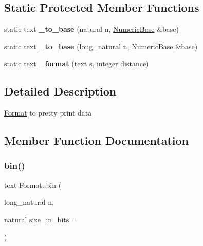 \subsection*{Static Protected Member Functions}
\begin{DoxyCompactItemize}
\item 
\mbox{\label{classez_1_1essential_1_1Format_abd388160f737b12027656a9a6328e7c0}} 
static text {\bfseries \+\_\+to\+\_\+base} (natural n, \hyperlink{classez_1_1essential_1_1NumericBase}{Numeric\+Base} \&base)
\item 
\mbox{\label{classez_1_1essential_1_1Format_aed6b5776c9c040d952d7a4058fa0a51d}} 
static text {\bfseries \+\_\+to\+\_\+base} (long\+\_\+natural n, \hyperlink{classez_1_1essential_1_1NumericBase}{Numeric\+Base} \&base)
\item 
\mbox{\label{classez_1_1essential_1_1Format_a243e4d7ade39eaf54436b198b67b1243}} 
static text {\bfseries \+\_\+format} (text s, integer distance)
\end{DoxyCompactItemize}


\subsection{Detailed Description}
\hyperlink{classez_1_1essential_1_1Format}{Format} to pretty print data 

\subsection{Member Function Documentation}
\mbox{\label{classez_1_1essential_1_1Format_a9fe91dede9e02e992d4ab410d89a0e21}} 
\subsubsection{\texorpdfstring{bin()}{bin()}}
{\footnotesize\ttfamily text Format\+::bin (\begin{DoxyParamCaption}\item[{long\+\_\+natural}]{n,  }\item[{natural}]{size\+\_\+in\+\_\+bits = {} }\end{DoxyParamCaption})\hspace{0.3cm}{\ttfamily [static]}}

